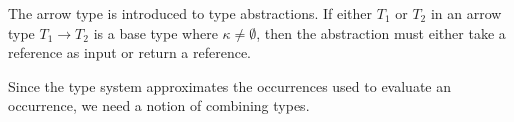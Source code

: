 \documentclass{llncs}
\newcommand{\set}[1]{\ensuremath{\{ #1 \}}}
\newcommand{\refc}{\ensuremath{\textrm{ref}\xspace}}
\begin{document}
The arrow type is introduced to type abstractions.
If either $T_1$ or $T_2$ in an arrow type $T_1 \to T_2$ is a base type where $\kappa \neq \emptyset$,
then the abstraction must either take a reference as input or return a reference.



Since the type system approximates the occurrences used to evaluate an occurrence, we need a notion of combining types.
\end{document}
